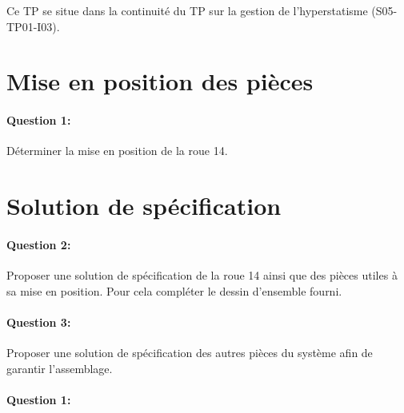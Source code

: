 

\cleardoublepage

Ce TP se situe dans la continuité du TP sur la gestion de l'hyperstatisme (S05-TP01-I03).

\section{Mise en position des pièces}

\paragraph{Question 1:} Déterminer la mise en position de la roue 14.

\reponse[4]

\section{Solution de spécification}

\paragraph{Question 2:} Proposer une solution de spécification de la roue 14 ainsi que des pièces utiles à sa mise en position. Pour cela compléter le dessin d'ensemble fourni.

\paragraph{Question 3:} Proposer une solution de spécification des autres pièces du système afin de garantir l'assemblage.





\pagestyle{correction}\setcounter{section}{0}

\paragraph{Question 1:}
